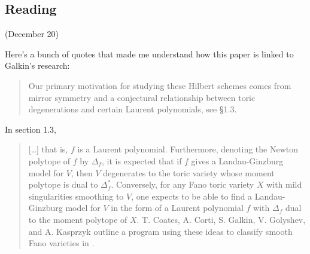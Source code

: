 \subsection{Reading \cite{jan4}}

(December 20)

{\color{2}Here's a bunch of quotes that made me understand how this paper is linked to Galkin's research:}
\begin{quotation}
	Our primary motivation for studying these Hilbert schemes comes from mirror symmetry and a conjectural relationship between toric degenerations and certain Laurent polynomials, see §1.3.
\end{quotation}

In section 1.3,

\begin{quotation}
	[…] that is, $f$ is a Laurent polynomial. Furthermore, denoting the Newton polytope of $f$ by $\Delta_f$, it is expected that if $f$ gives a Landau-Ginzburg model for $V$, then $V$ degenerates to the toric variety whose moment polytope is dual to $\Delta_f^*$. Conversely, for any Fano toric variety $X$ with mild singularities smoothing to $V$, one expects to be able to find a Landau-Ginzburg model for $V$ in the form of a Laurent polynomial $f$ with $\Delta_f$ dual to the moment polytope of $X$. T. Coates, A. Corti, {\color{14}S. Galkin}, V. Golyshev, and A. Kasprzyk outline a program using these ideas to classify smooth Fano varieties in \cite{mifa}.
\end{quotation}

